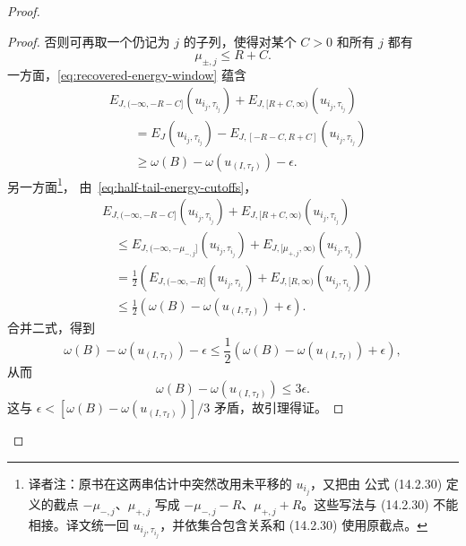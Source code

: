 \begin{proof}
\begin{proof}
否则可再取一个仍记为 $j$ 的子列，使得对某个 $C>0$ 和所有 $j$ 都有
\[
  \mu_{\pm,j}\leq R+C.
\]
一方面，\eqref{eq:recovered-energy-window} 蕴含
\[
  \begin{aligned}
  &E_{J,(-\infty,-R-C]}(u_{i_j,\tau_{i_j}})
   +E_{J,[R+C,\infty)}(u_{i_j,\tau_{i_j}})\\
  &\qquad
   =E_J(u_{i_j,\tau_{i_j}})
    -E_{J,[-R-C,R+C]}(u_{i_j,\tau_{i_j}})\\
  &\qquad
   \geq\omega(B)-\omega(u_{(I,\tau_I)})-\epsilon.
  \end{aligned}
\]
另一方面\footnote{译者注：原书在这两串估计中突然改用未平移的 $u_{i_j}$，又把由
公式 (14.2.30) 定义的截点 $-\mu_{-,j}$、$\mu_{+,j}$ 写成
$-\mu_{-,j}-R$、$\mu_{+,j}+R$。这些写法与 (14.2.30) 不能相接。译文统一回
$u_{i_j,\tau_{i_j}}$，并依集合包含关系和 (14.2.30) 使用原截点。}，
由~\eqref{eq:half-tail-energy-cutoffs}，
\[
  \begin{aligned}
  &E_{J,(-\infty,-R-C]}(u_{i_j,\tau_{i_j}})
   +E_{J,[R+C,\infty)}(u_{i_j,\tau_{i_j}})\\
  &\quad\leq
   E_{J,(-\infty,-\mu_{-,j}]}(u_{i_j,\tau_{i_j}})
   +E_{J,[\mu_{+,j},\infty)}(u_{i_j,\tau_{i_j}})\\
  &\quad=
   \frac12\left(
     E_{J,(-\infty,-R]}(u_{i_j,\tau_{i_j}})
     +E_{J,[R,\infty)}(u_{i_j,\tau_{i_j}})
   \right)\\
  &\quad\leq
   \frac12\left(
     \omega(B)-\omega(u_{(I,\tau_I)})+\epsilon
   \right).
  \end{aligned}
\]
合并二式，得到
\[
  \omega(B)-\omega(u_{(I,\tau_I)})-\epsilon
  \leq
  \frac12\left(
    \omega(B)-\omega(u_{(I,\tau_I)})+\epsilon
  \right),
\]
从而
\[
  \omega(B)-\omega(u_{(I,\tau_I)})\leq3\epsilon.
\]
这与 $\epsilon<[\omega(B)-\omega(u_{(I,\tau_I)})]/3$ 矛盾，故引理得证。
\end{proof}


\end{proof}
